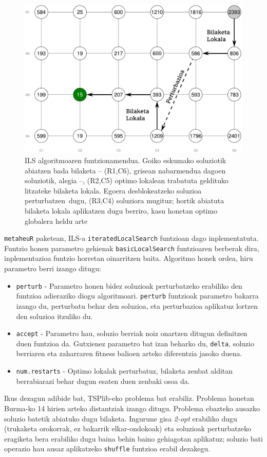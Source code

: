 \documentclass[eu]{ifirak}\usepackage[]{graphicx}\usepackage[]{color}
\newcommand{\zkk}{\guillemotleft}
\newcommand{\skk}{\guillemotright}
\newcommand{\code}[1]{\texttt{#1}}
\begin{document}
\begin{figure}[t]
\centering
\includegraphics[width=0.66\linewidth]{./Irudiak/ILS}
\caption{ILS algoritmoaren funtzionamendua. Goiko eskumako soluziotik abiatzen bada bilaketa -- (R1,C6), grisean nabarmendua dagoen soluziotik, alegia --, (R2,C5) optimo lokalean trabatuta geldituko litzateke bilaketa lokala. Egoera desblokeatzeko soluzioa \zkk perturbatzen\skk\ dugu, (R3,C4) soluziora mugituz; hortik abiatuta bilaketa lokala aplikatzen dugu berriro, kasu honetan optimo globalera heldu arte}
\label{fig:ILS}
\end{figure}

\code{metaheuR} paketean, ILS-a \code{iteratedLocalSearch} funtzioan dago inplementatuta. Funtzio honen parametro gehienak \code{basicLocalSearch} funtzioaren berberak dira, inplementazioa funtzio horretan oinarritzen baita. Algoritmo honek ordea, hiru parametro berri izango ditugu:

\begin{itemize}
\item \code{perturb} - Parametro honen bidez soluzioak perturbatzeko erabiliko den funtzioa adieraziko diogu algoritmoari. \code{perturb} funtzioak parametro bakarra izango du, perturbatu behar den soluzioa, eta perturbazioa aplikatuz lortzen den soluzioa itzuliko du.
\item \code{accept} -  Parametro hau, soluzio berriak noiz onartzen ditugun definitzen duen funtzioa da. Gutxienez parametro bat izan beharko du, \code{delta}, soluzio berriaren eta zaharraren fitness balioen arteko diferentzia jasoko duena.
\item \code{num.restarts} - Optimo lokalak perturbatuz, bilaketa zenbat alditan berrabiarazi behar dugun esaten duen zenbaki osoa da.
\end{itemize}

Ikus dezagun adibide bat, TSPlib-eko problema bat erabiliz. Problema honetan Burma-ko 14 hirien arteko distantziak izango ditugu. Problema ebazteko ausazko soluzio batetik abiatuko dugu bilaketa. Ingurune gisa \textit{2-opt} erabiliko dugu (trukaketa orokorrak, ez bakarrik elkar-ondokoak) eta soluzioak perturbatzeko eragiketa bera erabiliko dugu baina behin baino gehiagotan aplikatuz; soluzio bati operazio hau ausaz aplikatzeko \code{shuffle} funtzioa erabil dezakegu.
\end{document}
